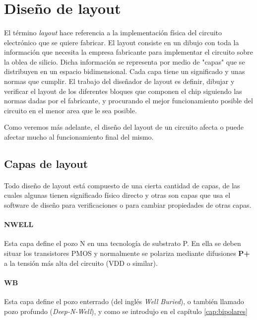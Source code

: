 \section{Diseño de layout}\label{cap:layout}

\paragraph{}
El término \textit{layout} hace referencia a la implementación física del circuito
electrónico que se quiere fabricar. El layout consiste en un dibujo con toda
la información que necesita la empresa fabricante para implementar el circuito
sobre la oblea de silicio. Dicha información se representa por medio de "capas"
que se distribuyen en un espacio bidimensional. Cada capa tiene un significado y
unas normas que cumplir. El trabajo del diseñador de layout es definir, dibujar y
verificar el layout de los diferentes bloques que componen el chip siguiendo
las normas dadas por el fabricante, y procurando el mejor funcionamiento posible
del circuito en el menor area que le sea posible.

Como veremos más adelante, el diseño del layout de un circuito afecta o puede afectar
mucho al funcionamiento final del mismo.

\subsection{Capas de layout}\label{cap:capas_layout}

\paragraph{}
Todo diseño de layout está compuesto de una cierta cantidad de capas, de las cuales
algunas tienen significado físico directo y otras son capas que usa el software de
diseño para verificaciones o para cambiar propiedades de otras capas.

\paragraph{NWELL}
Esta capa define el pozo N en una tecnología de substrato P. En ella se deben
situar los transistores PMOS y normalmente se polariza mediante difusiones \textbf{P+}
a la tensión más alta del circuito (VDD o similar).

\paragraph{WB}
Esta capa define el pozo enterrado (del inglés \textit{Well Buried}), o también
llamado pozo profundo (\textit{Deep-N-Well}), y como se introdujo en el capítulo
\ref{cap:bipolares}

